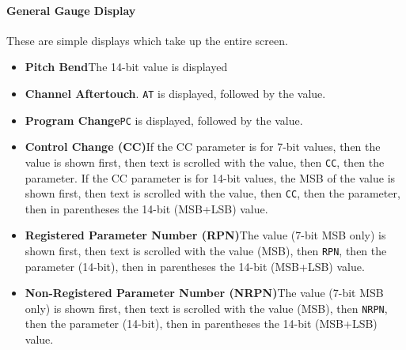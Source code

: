 \documentclass{article}
\begin{document}
\paragraph{General Gauge Display}  These are simple displays which take up the entire screen.

\begin{itemize}
\item {\bf Pitch Bend}\quad The 14-bit value is displayed
\item {\bf Channel Aftertouch}.  \texttt{AT} is displayed, followed by the value.
\item {\bf Program Change}\quad \texttt{PC} is displayed, followed by the value.
\item {\bf Control Change (CC)}\quad If the CC parameter is for 7-bit values, then the value is shown first, then text is scrolled with the value, then \texttt{CC}, then the parameter.  If the CC parameter is for 14-bit values, the MSB of the value is shown first, then text is scrolled with the value, then \texttt{CC}, then the parameter, then in parentheses the 14-bit (MSB+LSB) value.
\item {\bf Registered Parameter Number (RPN)}\quad The value (7-bit MSB only) is shown first, then text is scrolled with the value (MSB), then \texttt{RPN}, then the parameter (14-bit), then in parentheses the 14-bit (MSB+LSB) value.
\item {\bf Non-Registered Parameter Number (NRPN)}\quad The value (7-bit MSB only) is shown first, then text is scrolled with the value (MSB), then \texttt{NRPN}, then the parameter (14-bit), then in parentheses the 14-bit (MSB+LSB) value.
\end{itemize}
\end{document}
